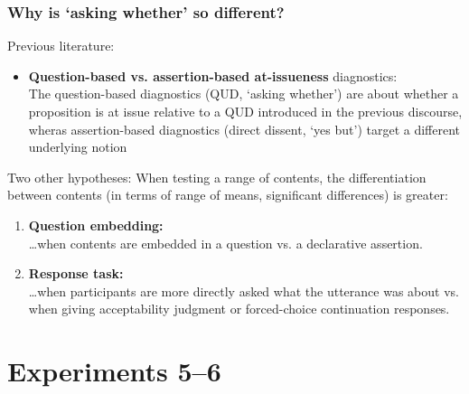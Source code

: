 \documentclass[compress, xcolor = dvipsnames, aspectratio=169]{beamer}
\begin{document}
	\begin{frame}[t]\frametitle{Why is `asking whether' so different?}\small 
		Previous literature:
		\begin{itemize}
			\item \textbf{Question-based vs. assertion-based at-issueness} diagnostics:\\
				The question-based diagnostics (QUD, `asking whether') are about whether a proposition is at issue relative to a QUD introduced in the previous discourse, wheras assertion-based diagnostics (direct dissent, `yes but') target a different underlying notion

		\end{itemize}\pause
		\vfill 

		Two other hypotheses: When testing a range of contents, the differentiation between contents (in terms of range of means, significant differences) is greater:
		\begin{enumerate}
			\item \textbf{Question embedding:} \\ 
				\dots when contents are embedded in a question vs. a declarative assertion.\pause
				
			\item \textbf{Response task:} \\ \dots when participants are more directly asked what the utterance was about vs. when giving acceptability judgment or forced-choice continuation responses.
			
		\end{enumerate}

	\end{frame}

\section{Experiments 5–6}
\end{document}
